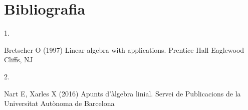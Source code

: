 \documentclass[
  11pt,
]{book}
\newlength{\cslhangindent}
\newlength{\csllabelwidth}
\newenvironment{CSLReferences}[2] %
 {\begin{list}{}{%
  \setlength{\itemindent}{0pt}
  \setlength{\leftmargin}{0pt}
  \setlength{\parsep}{0pt}
  \ifodd #1
   \setlength{\leftmargin}{\cslhangindent}
   \setlength{\itemindent}{-1\cslhangindent}
  \fi
  \setlength{\itemsep}{#2\baselineskip}}}
 {\end{list}}
\newcommand{\CSLLeftMargin}[1]{\parbox[t]{\csllabelwidth}{\strut#1\strut}}
\newcommand{\CSLRightInline}[1]{\parbox[t]{\linewidth - \csllabelwidth}{\strut#1\strut}}
\numberwithin{dummy}{section}
\theoremstyle{maincolornumbox}
\theoremstyle{blacknumex}
\theoremstyle{blacknumbox}
\theoremstyle{maincolornum}
\begin{document}
\chapter*{Bibliografia}\label{bibliografia}

\label{refs}
\begin{CSLReferences}{0}{1}
\CSLLeftMargin{1. }%
\CSLRightInline{Bretscher O (1997) Linear algebra with applications. Prentice Hall Eaglewood Cliffs, NJ}

\CSLLeftMargin{2. }%
\CSLRightInline{Nart E, Xarles X (2016) Apunts d'{à}lgebra linial. Servei de Publicacions de la Universitat Aut{ò}noma de Barcelona}

\end{CSLReferences}
\end{document}
